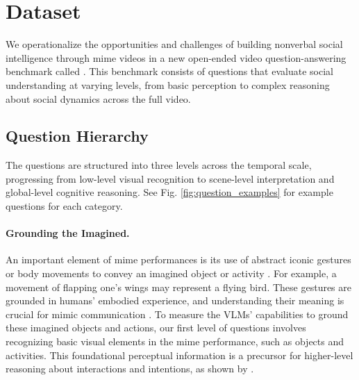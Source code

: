 
\section{{\data} Dataset}

We operationalize the opportunities and challenges of building nonverbal social intelligence through mime videos in a new open-ended video question-answering benchmark called {\data}. This benchmark consists of questions that evaluate social understanding at varying levels, from basic perception to complex reasoning about social dynamics across the full video.

\subsection{Question Hierarchy}
The {\data} questions are structured into three levels across the temporal scale, progressing from low-level visual recognition to scene-level interpretation and global-level cognitive reasoning. See Fig. \ref{fig:question_examples} for example questions for each category.

\paragraph{Grounding the Imagined.} An important element of mime performances is its use of abstract iconic gestures or body movements to convey an imagined object or activity \cite{zywiczynski2018defining}. For example, a movement of flapping one's wings may represent a flying bird. These gestures are grounded in humans' embodied experience, and understanding their meaning is crucial for mimic communication \cite{gardenfors2017demonstration, zlatev2020pantomime}. To measure the VLMs' capabilities to ground these imagined objects and actions, our first level of questions involves recognizing basic visual elements in the mime performance, such as objects and activities. This foundational perceptual information is a precursor for higher-level reasoning about interactions and intentions, as shown by \citet{sibierska2022s}.

